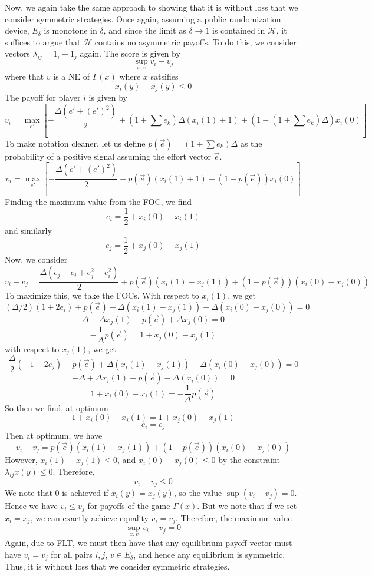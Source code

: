 \documentclass[10pt,letter]{article}
\begin{document}
Now, we again take the same approach to showing that it is without loss that we consider symmetric strategies. Once again, assuming a public randomization device, $E_\delta$ is monotone in $\delta$, and since the limit as $\delta \to 1$ is contained in $\mathcal{H}$, it suffices to argue that $\mathcal{H}$ contains no asymmetric payoffs. To do this, we consider vectors $\lambda_{ij} = 1_i - 1_j$ again. The score is given by
\[ \sup_{x,v} v_i - v_j \]
where that $v$ is a NE of $\Gamma(x)$ where $x$ satsifies
\[ x_i(y) - x_j(y) \le 0 \]
The payoff for player $i$ is given by
\[ v_i = \max_{e'} \left[ - \frac{\Delta(e' + (e')^2)}{2} + \left(1 + \sum e_k \right)\Delta (x_i(1) + 1)  + \left(1 - \left(1+ \sum e_k \right)\Delta \right)x_i(0) \right] \]
To make notation cleaner, let us define $p(\vec{e}) = \left(1 + \sum e_k \right)\Delta$ as the probability of a positive signal assuming the effort vector $\vec{e}$.
\[ v_i = \max_{e'} \left[ - \frac{\Delta(e' + (e')^2)}{2} + p(\vec{e}) (x_i(1) + 1)  + \left(1 - p(\vec{e}) \right)x_i(0) \right] \]
Finding the maximum value from the FOC, we find
\[ e_i = \frac{1}{2} + x_i(0) - x_i(1) \]
and similarly
\[ e_j = \frac{1}{2} + x_j(0) - x_j(1) \]
Now, we consider
\[ v_i - v_j = \frac{\Delta(e_j - e_i + e_j^2 - e_i^2)}{2} + p(\vec{e}) (x_i(1) - x_j(1))  + \left(1 - p(\vec{e}) \right)(x_i(0) - x_j(0)) \]
To maximize this, we take the FOCs. With respect to $x_i(1)$, we get
\[ (\Delta/2)(1 + 2e_i) + p(\vec{e}) + \Delta (x_i(1) - x_j(1)) - \Delta (x_i(0) - x_j(0)) = 0 \]
\[ \Delta - \Delta x_j(1) + p(\vec{e}) + \Delta x_j(0) = 0 \]
\[ -\frac{1}{\Delta} p(\vec{e}) = 1 + x_j(0) - x_j(1) \]
with respect to $x_j(1)$, we get
\[ \frac{\Delta}{2}(-1 - 2e_j) - p(\vec{e}) + \Delta(x_i(1) - x_j(1)) - \Delta(x_i(0) - x_j(0)) = 0 \]
\[- \Delta + \Delta x_i(1)  - p(\vec{e}) - \Delta(x_i(0)) = 0 \]
\[ 1  + x_i(0)-  x_i(1)  = -\frac{1}{\Delta}p(\vec{e}) \]
So then we find, at optimum
\[1  + x_i(0)-  x_i(1) = 1 + x_j(0) - x_j(1) \]
\[ e_i = e_j \]
Then at optimum, we have
\[ v_i - v_j = p(\vec{e}) (x_i(1) - x_j(1))  + \left(1 - p(\vec{e}) \right)(x_i(0) - x_j(0))  \]
However, $x_i(1) - x_j(1) \le 0$, and $x_i(0) - x_j(0) \le 0$ by the constraint $\lambda_{ij} x(y) \le 0$. Therefore,
\[ v_i - v_j \le 0 \]
We note that 0 is achieved if $x_i(y) = x_j(y)$, so the value  $\sup (v_i - v_j) = 0$.
Hence we have $v_i \le v_j$ for payoffs of the game $\Gamma(x)$. But we note that if we set $x_i = x_j$, we can exactly achieve equality $v_i = v_j$. Therefore, the maximum value
\[ \sup_{x,v} v_i - v_j = 0\]
Again, due to FLT, we must then have that any equilibrium payoff vector must have $v_i = v_j$ for all pairs $i, j$, $v \in E_\delta$, and hence any equilibrium is symmetric. Thus, it is without loss that we consider symmetric strategies.
\pagebreak
\end{document}
